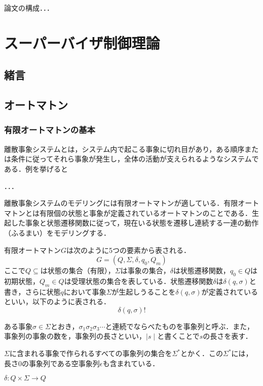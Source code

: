 \documentclass[dvipdfmx]{newthesis}
\begin{document}
論文の構成．．．
　
\chapter{スーパーバイザ制御理論}
\setcounter{section}{-1}
\section{緒言}

\section{オートマトン}
\subsection{有限オートマトンの基本}

離散事象システムとは，システム内で起こる事象に切れ目があり，ある順序または条件に従ってそれら事象が発生し，全体の活動が支えられるようなシステムである\cite{DES}．例を挙げると

．．．

離散事象システムのモデリングには有限オートマトンが適している．有限オートマトンとは有限個の状態と事象が定義されているオートマトンのことである．生起した事象と状態遷移関数に従って，現在いる状態を遷移し連続する一連の動作（ふるまい）をモデリングする．

有限オートマトン$G$は次のように5つの要素から表される．
\begin{equation}
    G = (Q, \Sigma, \delta, q_{0}, Q_{m})
\end{equation}
ここで$Q\subseteq$は状態の集合（有限），$\Sigma$は事象の集合，$\delta$は状態遷移関数，$q_0\in Q$は初期状態，$Q_m\in  Q$は受理状態の集合を表している．状態遷移関数$\delta$は$\delta(q,\sigma)$と書き，さらに状態$q$において事象$\Sigma$が生起しうることを$\delta(q,\sigma)$が定義されているといい，以下のように表される．
$$\delta(q,\sigma)!$$

ある事象$\sigma\in\Sigma$とおき，$\sigma_1 \sigma_2 \sigma_3 \cdots$と連続でならべたものを事象列と呼ぶ．また，事象列の事象の数を，事象列の長さといい，$\mid s\mid$と書くことで$s$の長さを表す．

$\Sigma$に含まれる事象で作られるすべての事象列の集合を$\Sigma^\ast$とかく．この$\Sigma^\ast$には，長さ0の事象列である空事象列$\epsilon$も含まれている．

$\delta:Q\times\Sigma\rightarrow Q$
\end{document}

